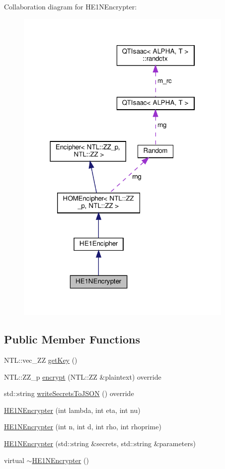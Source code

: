 Collaboration diagram for H\+E1\+N\+Encrypter\+:
\nopagebreak
\begin{figure}[H]
\begin{center}
\leavevmode
\includegraphics[width=298pt]{classHE1NEncrypter__coll__graph}
\end{center}
\end{figure}
\subsection*{Public Member Functions}
\begin{DoxyCompactItemize}
\item 
N\+T\+L\+::vec\+\_\+\+ZZ \hyperlink{classHE1NEncrypter_a68735a56be50d13e04824e48a61fc2f8}{get\+Key} ()
\item 
N\+T\+L\+::\+Z\+Z\+\_\+p \hyperlink{classHE1NEncrypter_a9a9c76558466ac56093cb6da937c7fe3}{encrypt} (N\+T\+L\+::\+ZZ \&plaintext) override
\item 
std\+::string \hyperlink{classHE1NEncrypter_ad1bca3e0933b8e15b91d208e421f83b2}{write\+Secrets\+To\+J\+S\+ON} () override
\item 
\hyperlink{classHE1NEncrypter_ac8b2f33fc7d1cba481944b16072efab0}{H\+E1\+N\+Encrypter} (int lambda, int eta, int nu)
\item 
\hyperlink{classHE1NEncrypter_a744ec5a8d26d1877114d6bd679a9e9ed}{H\+E1\+N\+Encrypter} (int n, int d, int rho, int rhoprime)
\item 
\hyperlink{classHE1NEncrypter_ac8eae729be42e97261e0387540699b75}{H\+E1\+N\+Encrypter} (std\+::string \&secrets, std\+::string \&parameters)
\item 
virtual \hyperlink{classHE1NEncrypter_a995b560b8ae6270eb325b52b0073e86b}{$\sim$\+H\+E1\+N\+Encrypter} ()
\end{DoxyCompactItemize}

